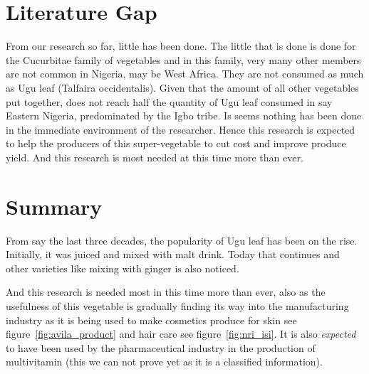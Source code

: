 \section{Literature Gap}
From our research so far, little has been done. The little that is done is done for the Cucurbitae family of vegetables and in this family, very many other members are not common in Nigeria, may be West Africa. They are not consumed as much as Ugu leaf (Talfaira occidentalis). Given that the amount of all other vegetables put together, does not reach half the quantity of Ugu leaf consumed in say Eastern Nigeria, predominated by the Igbo tribe. Is seems nothing has been done in the immediate environment of the researcher. Hence this research is expected to help the producers of this super-vegetable to cut cost and improve produce yield. And this research is most needed at this time more than ever.

\section{Summary}
From say the last three decades, the popularity of Ugu leaf has been on the rise. Initially, it was juiced and mixed with malt drink. Today that continues and other varieties like mixing with ginger is also noticed. 

 And this research is needed most in this time more than ever, also as the usefulness of this vegetable is gradually finding its way into the manufacturing industry as it is being used to make cosmetics produce for skin see figure~\ref{fig:avila_product} and hair care see figure~\ref{fig:nri_isi}. It is also \emph{expected} to have been used by the pharmaceutical industry in the production of multivitamin (this we can not prove yet as it is a classified information).


